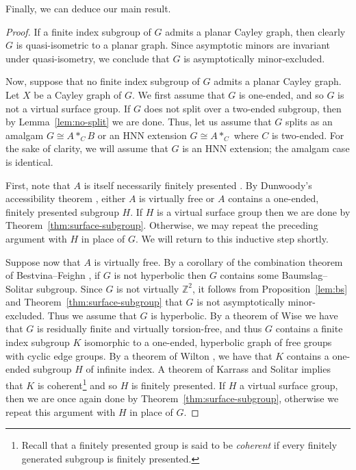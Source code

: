 \documentclass[10pt,a4paper]{amsart}
\newcommand{\Z}{\mathbb{Z}}
\theoremstyle{definition}
\begin{document}
Finally, we can deduce our main result. 

\fp*


\begin{proof}
    If a finite index subgroup of $G$ admits a planar Cayley graph, then clearly $G$ is quasi-isometric to a planar graph. Since asymptotic minors are invariant under quasi-isometry, we conclude that $G$ is asymptotically minor-excluded. 

    Now, suppose that no finite index subgroup of $G$ admits a planar Cayley graph. 
    Let $X$ be a Cayley graph of $G$. 
    We first assume that $G$ is one-ended, and so $G$ is not a virtual surface group. If $G$ does not split over a two-ended subgroup, then by Lemma~\ref{lem:no-split} we are done. Thus, let us assume that $G$ splits as an amalgam $G \cong A \ast_C B$ or an HNN extension $G \cong A \ast _C$ where $C$ is two-ended. For the sake of clarity, we will assume that $G$ is an HNN extension; the amalgam case is identical. 

    First, note that $A$ is itself necessarily finitely presented \cite{haglund2021note}. By Dunwoody's accessibility theorem \cite{dunwoody1985accessibility}, either $A$ is virtually free or $A$ contains a one-ended, finitely presented subgroup $H$. If $H$ is a virtual surface group then we are done by Theorem~\ref{thm:surface-subgroup}. Otherwise, we may repeat the preceding argument with $H$ in place of $G$. We will return to this inductive step shortly.

    Suppose now that $A$ is virtually free. By a corollary of the combination theorem of Bestvina--Feighn \cite{bestvina1992combination, bestvina1996addendum}, if $G$ is not hyperbolic then $G$ contains some Baumslag--Solitar subgroup. Since $G$ is not virtually $\Z^2$, it follows from Proposition~\ref{lem:bs} and Theorem~\ref{thm:surface-subgroup} that $G$ is not asymptotically minor-excluded. Thus we assume that $G$ is hyperbolic. By a theorem of Wise \cite[Thm.~4.19]{wise2000subgroup} we have that $G$ is residually finite and virtually torsion-free, and thus $G$ contains a finite index subgroup $K$ isomorphic to a one-ended, hyperbolic graph of free groups with cyclic edge groups. By a theorem of Wilton \cite{wilton2012one}, we have that $K$ contains a one-ended subgroup $H$ of  infinite index. A theorem of Karrass and Solitar \cite{karrass1970subgroups} implies that $K$ is coherent\footnote{Recall that a finitely presented group is said to be \textit{coherent} if every finitely generated subgroup is finitely presented.} and so $H$ is finitely presented. If $H$ a virtual surface group, then we are once again done by Theorem~\ref{thm:surface-subgroup}, otherwise we repeat this argument with $H$ in place of $G$. 


\end{proof}
\end{document}
